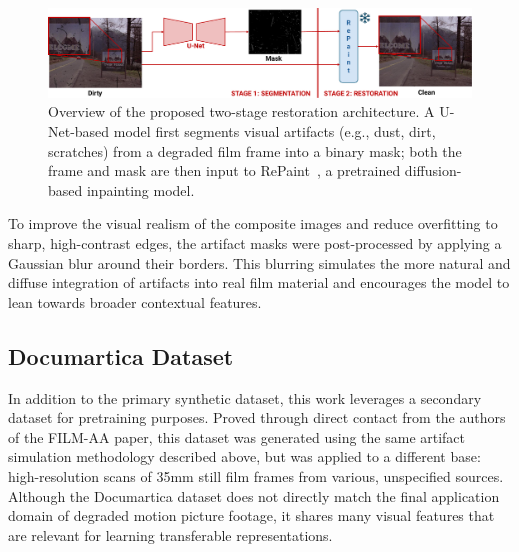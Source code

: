 \documentclass[10pt,a4paper,twocolumn,twoside]{article}
\begin{document}
\begin{figure}[t]
  \centering
    \includegraphics[width= \textwidth]{img/Diagrama_Two_Stage_BO.pdf}\vspace{-0.6em}
    \caption{ \small
Overview of the proposed two-stage restoration architecture. A U-Net-based model first segments visual artifacts (e.g., dust, dirt, scratches) from a degraded film frame into a binary mask; both the frame and mask are then input to RePaint~\cite{repaint}, a pretrained diffusion-based inpainting model.
}
    \label{fig:two-stage}
\end{figure}

To improve the visual realism of the composite images and reduce overfitting to sharp, high-contrast edges, the artifact masks were post-processed by applying a Gaussian blur around their borders. This blurring simulates the more natural and diffuse integration of artifacts into real film material and encourages the model to lean towards broader contextual features.
\subsection{Documartica Dataset}
In addition to the primary synthetic dataset, this work leverages a secondary dataset for pretraining purposes. Proved through direct contact from the authors of the FILM-AA paper, this dataset was generated using the same artifact simulation methodology described above, but was applied to a different base: high-resolution scans of 35mm still film frames from various, unspecified sources. \\ Although the Documartica dataset does not directly match the final application domain of degraded motion picture footage, it shares many visual features that are relevant for learning transferable representations.
\vspace*{-0.5em}
\end{document}
